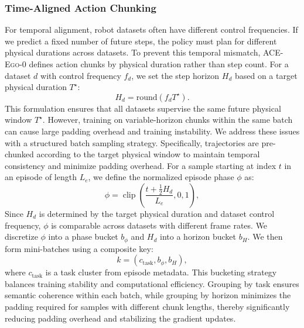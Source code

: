 \documentclass{article}
\newcommand{\OURS}{\textsc{ACE-Ego-0}\xspace}
\newcommand{\Ours}{\OURS}
\begin{document}
\subsubsection{Time-Aligned Action Chunking}
\label{sec:time-aligned-dynamic-chunking}

For temporal alignment, robot datasets often have different control frequencies.
If we predict a fixed number of future steps, the policy must plan for different physical durations across datasets. To prevent this temporal mismatch, \Ours defines action chunks by physical duration rather than step count.
For a dataset \(d\) with control frequency \(f_d\), we set the step horizon \(H_d\) based on a target physical duration \(T^\star\):
\begin{equation}
H_d = \mathrm{round}\!\left(f_d T^\star\right).
\label{eq:horizon}
\end{equation}
This formulation ensures that all datasets supervise the same future physical window \(T^\star\). However, training on variable-horizon chunks within the same batch can cause large padding overhead and training instability. We address these issues with a structured batch sampling strategy. Specifically, trajectories are pre-chunked according to the target physical window to maintain temporal consistency and minimize padding overhead. For a sample starting at index \(t\) in an episode of length \(L_e\), we define the normalized episode phase \(\phi\) as:
\begin{equation}
\phi = \operatorname{clip}\!\left( \frac{t + \tfrac{1}{2}H_d}{L_e}, 0, 1 \right),
\label{eq:episode-phase}
\end{equation}
Since \(H_d\) is determined by the target physical duration and dataset control frequency, \(\phi\) is comparable across datasets with different frame rates. We discretize \(\phi\) into a phase bucket \(b_{\phi}\) and \(H_d\) into a horizon bucket \(b_H\). We then form mini-batches using a composite key:
\begin{equation}
k = \left(c_{\mathrm{task}}, b_{\phi}, b_H\right),
\label{eq:batch-key}
\end{equation}
where \(c_{\mathrm{task}}\) is a task cluster from episode metadata. 
This bucketing strategy balances training stability and computational efficiency. Grouping by task ensures semantic coherence within each batch, while grouping by horizon minimizes the padding required for samples with different chunk lengths, thereby significantly reducing padding overhead and stabilizing the gradient updates.
\end{document}
